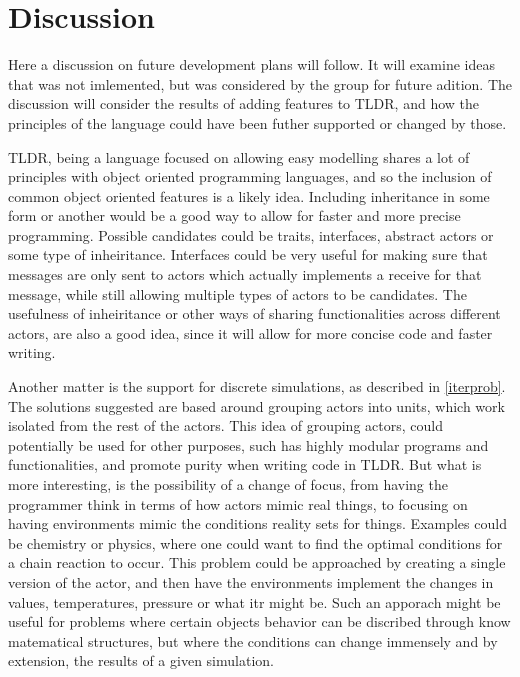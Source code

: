 \chapter{Discussion}

Here a discussion on future development plans will follow. It will examine ideas that was not imlemented, but was considered by the group for future adition. The discussion will consider the results of adding features to TLDR, and how the principles of the language could have been futher supported or changed by those.

TLDR, being a language focused on allowing easy modelling shares a lot of principles with object oriented programming languages, and so the inclusion of common object oriented features is a likely idea. Including inheritance in some form or another would be a good way to allow for faster and more precise programming. Possible candidates could be traits, interfaces, abstract actors or some type of inheiritance. Interfaces could be very useful for making sure that messages are only sent to actors which actually implements a receive for that message, while still allowing multiple types of actors to be candidates. The usefulness of inheiritance or other ways of sharing functionalities across different actors, are also a good idea, since it will allow for more concise code and faster writing.

Another matter is the support for discrete simulations, as described in \cref{iterprob}. The solutions suggested are based around grouping actors into units, which work isolated from the rest of the actors. This idea of grouping actors, could potentially be used for other purposes, such has highly modular programs and functionalities, and promote purity when writing code in TLDR. But what is more interesting, is the possibility of a change of focus, from having the programmer think in terms of how actors mimic real things, to focusing on having environments mimic the conditions reality sets for things. Examples could be chemistry or physics, where one could want to find the optimal conditions for a chain reaction to occur. This problem could be approached by creating a single version of the actor, and then have the environments implement the changes in values, temperatures, pressure or what itr might be. Such an apporach might be useful for problems where certain objects behavior can be discribed through know matematical structures, but where the conditions can change immensely and by extension, the results of a given simulation.